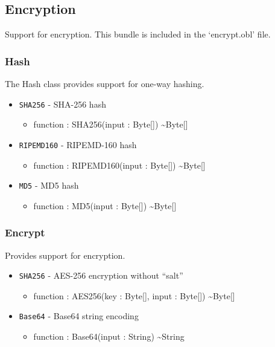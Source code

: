 \documentclass[11pt]{article}
\begin{document}
\subsection{Encryption}
Support for encryption.  This bundle is included in the `encrypt.obl' file.

\subsubsection{Hash}
The Hash class provides support for one-way hashing.

\begin{itemize}
\item \texttt{SHA256} - SHA-256 hash
  \begin{itemize}
  \item function : SHA256(input : Byte[]) \textasciitilde Byte[]
  \end{itemize}
\end{itemize}

\begin{itemize}
\item \texttt{RIPEMD160} - RIPEMD-160 hash
  \begin{itemize}
  \item function : RIPEMD160(input : Byte[]) \textasciitilde Byte[]
  \end{itemize}
\end{itemize}

\begin{itemize}
\item \texttt{MD5} - MD5 hash
  \begin{itemize}
  \item function : MD5(input : Byte[]) \textasciitilde Byte[]
  \end{itemize}
\end{itemize}

\subsubsection{Encrypt}
Provides support for encryption.

\begin{itemize}
\item \texttt{SHA256} - AES-256 encryption without ``salt''
  \begin{itemize}
  \item function : AES256(key : Byte[], input : Byte[])
    \textasciitilde Byte[]
  \end{itemize}
\item \texttt{Base64} - Base64 string encoding
  \begin{itemize}
  \item function : Base64(input : String) \textasciitilde String
  \end{itemize}
\end{itemize}
\end{document}
